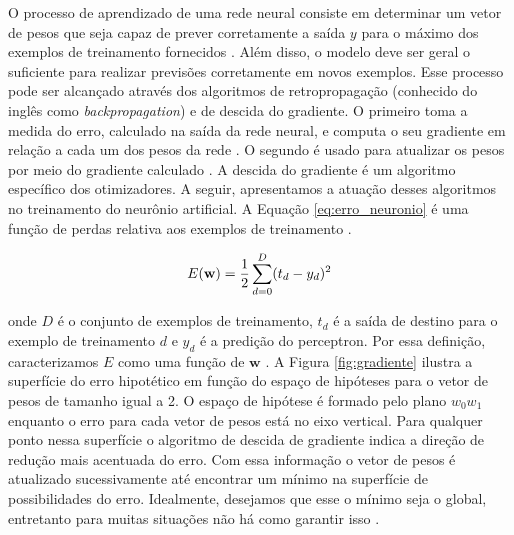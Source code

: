 
O processo de aprendizado de uma rede neural consiste em determinar um vetor de pesos que seja capaz de prever corretamente a saída $y$ para o máximo dos exemplos de treinamento fornecidos \cite{Mitchell}. Além disso, o modelo deve ser geral o suficiente para realizar previsões corretamente em novos exemplos. 
Esse processo pode ser alcançado através dos algoritmos de retropropagação (conhecido do  inglês como \textit{backpropagation}) \cite{rumelhart1988learning, Goodfellow2016} e de descida do gradiente. O primeiro toma a medida do erro, calculado na saída da rede neural, e computa o seu gradiente em relação a cada um dos pesos da rede \cite{Goodfellow2016}. O segundo é usado para atualizar os pesos por meio do gradiente calculado  \cite{Mitchell}.  A descida do gradiente é um algoritmo específico dos otimizadores.  
A seguir, apresentamos a atuação desses algoritmos no treinamento do neurônio artificial.  A Equação \ref{eq:erro_neuronio} é uma função de perdas relativa aos exemplos de treinamento \cite{Mitchell}.

\begin{equation}
\label{eq:erro_neuronio}
\begin{aligned}
\centering    
E(\textbf{w}) = \displaystyle \frac{1}{2}\sum_{d=0}^{D}( t_{d} - y_{d})^{2}  
\end{aligned}
\end{equation}

\noindent onde $D$ é o conjunto de exemplos de treinamento, $t_{d}$ é a saída de destino para o exemplo de treinamento $d$ e $y_{d}$ é a predição do perceptron. Por essa definição, caracterizamos $E$ como uma função de $\textbf{w}$ \cite{Mitchell}.
A Figura \ref{fig:gradiente} ilustra a superfície do erro hipotético em função do espaço de hipóteses para o vetor de pesos de tamanho igual a 2. O espaço de hipótese é formado pelo plano $w_0w_1$ enquanto o erro para cada vetor de pesos está no eixo vertical. Para qualquer ponto nessa superfície o algoritmo de descida de gradiente indica a direção de redução mais acentuada do erro. Com essa informação o vetor de pesos é atualizado sucessivamente até encontrar um mínimo na superfície de possibilidades do erro. Idealmente, desejamos que esse o mínimo seja o global, entretanto para muitas situações não há como garantir isso \cite{Mitchell}. 

